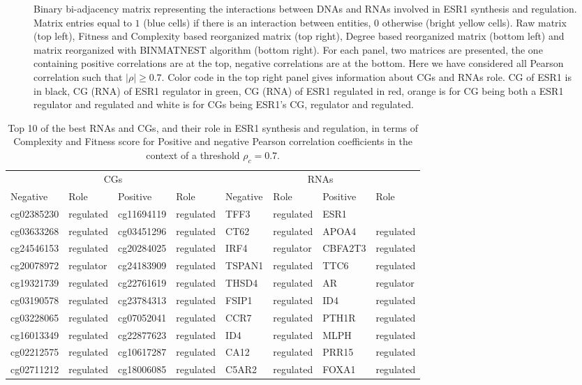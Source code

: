 \documentclass[10pt,a4paper]{article}
\begin{document}
\begin{figure}[h!]
{}
\caption{\label{fig:fig3}Binary bi-adjacency matrix representing the interactions between DNAs and RNAs involved in ESR1 synthesis and regulation. Matrix entries equal to $1$ (blue cells) if there is an interaction between entities, $0$ otherwise (bright yellow cells). Raw matrix (top left), Fitness and Complexity based reorganized matrix (top right), Degree based reorganized matrix (bottom left) and matrix reorganized with BINMATNEST algorithm (bottom right). For each panel, two matrices are presented, the one containing positive correlations are at the top, negative correlations are at the bottom. Here we have considered all Pearson correlation such that $|\rho| \geq 0.7$. Color code in the top right panel gives information about CGs and RNAs role. CG of ESR1 is in black, CG (RNA) of ESR1 regulator in green, CG (RNA) of ESR1 regulated in red, orange is for CG being both a ESR1 regulator and regulated and white is for CGs being ESR1's CG, regulator and regulated.}
\end{figure}
 \begin{table}[h!]
\centering
\caption{\label{tab:tab5}Top 10 of the best RNAs and CGs, and their role in ESR1 synthesis and regulation, in terms of Complexity and Fitness score for Positive and negative Pearson correlation coefficients in the context of a threshold $\rho_{c} = 0.7$.}
\begin{tabular}{|ll|ll|ll|ll|}
\cline{1-8}
\multicolumn{4}{|c}{CGs}&\multicolumn{4}{c|}{RNAs}\\
\cline{1-8}
Negative & Role & Positive & Role & Negative & Role & Positive & Role\\
\cline{1-8}
cg02385230 & regulated & cg11694119 & regulated & TFF3 & regulated & ESR1 & \\
cg03633268 & regulated & cg03451296 & regulated & CT62 & regulated & APOA4 & regulated\\
cg24546153 & regulated & cg20284025 & regulated & IRF4 & regulator & CBFA2T3 & regulated\\
cg20078972 & regulator & cg24183909 & regulated & TSPAN1 & regulated & TTC6 & regulated\\
cg19321739 & regulated & cg22761619 & regulated & THSD4 & regulated & AR & regulator\\
cg03190578 & regulated & cg23784313 & regulated & FSIP1 & regulated & ID4 & regulated\\
cg03228065 & regulated & cg07052041 & regulated & CCR7 & regulated & PTH1R & regulated\\
cg16013349 & regulated & cg22877623 & regulated & ID4 & regulated & MLPH & regulated\\
cg02212575 & regulated & cg10617287 & regulated & CA12 & regulated & PRR15 & regulated\\
cg02711212 & regulated & cg18006085 & regulated & C5AR2 & regulated & FOXA1 & regulated\\
\cline{1-8}
\end{tabular}
\end{table}
\end{document}
